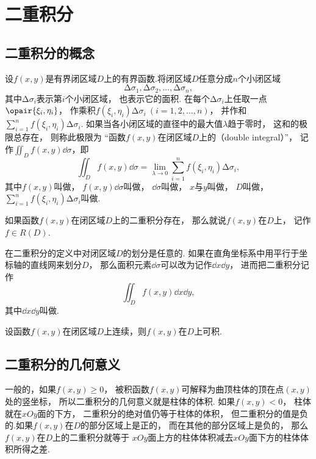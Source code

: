 \section{二重积分}
\subsection{二重积分的概念}
设\(f(x,y)\)是有界闭区域\(D\)上的有界函数.将闭区域\(D\)任意分成\(n\)个小闭区域\begin{equation*}
	\increment\sigma_1,\increment\sigma_2,\dotsc,\increment\sigma_n,
\end{equation*}
其中\(\increment\sigma_i\)表示第\(i\)个小闭区域，
也表示它的面积.
在每个\(\increment\sigma_i\)上任取一点\(\opair{\xi_i,\eta_i}\)，
作乘积\(f(\xi_i,\eta_i) \increment\sigma_i\ (i=1,2,\dotsc,n)\)，
并作和\(\sum_{i=1}^n f(\xi_i,\eta_i) \increment\sigma_i\).
如果当各小闭区域的直径中的最大值\(\lambda\)趋于零时，
这和的极限总存在，
则称此极限为
“函数\(f(x,y)\)在闭区域\(D\)上的（double integral）”，
记作\(\iint_D f(x,y) \dd{\sigma}\)，即
\begin{equation*}
	\iint_D f(x,y) \dd{\sigma}
	= \lim_{\lambda\to0}
	\sum_{i=1}^n f(\xi_i,\eta_i) \increment\sigma_i,
\end{equation*}
其中\(f(x,y)\)叫做，
\(f(x,y) \dd{\sigma}\)叫做，
\(\dd{\sigma}\)叫做，
\(x\)与\(y\)叫做，
\(D\)叫做，
\(\sum_{i=1}^n f(\xi_i,\eta_i) \increment\sigma_i\)叫做.

如果函数\(f(x,y)\)在闭区域\(D\)上的二重积分存在，
那么就说\(f(x,y)\)在\(D\)上，
记作\(f \in R(D)\).

在二重积分的定义中对闭区域\(D\)的划分是任意的.
如果在直角坐标系中用平行于坐标轴的直线网来划分\(D\)，
那么面积元素\(\dd{\sigma}\)可以改为记作\(\dd{x}\dd{y}\)，
进而把二重积分记作\begin{equation*}
	\iint_{D}{f(x,y)\dd{x}\dd{y}},
\end{equation*}
其中\(\dd{x}\dd{y}\)叫做.

\begin{theorem}[充分条件]
设函数\(f(x,y)\)在闭区域\(D\)上连续，则\(f(x,y)\)在\(D\)上可积.
\end{theorem}

\subsection{二重积分的几何意义}
一般的，如果\(f(x,y) \geq 0\)，
被积函数\(f(x,y)\)可解释为曲顶柱体的顶在点\((x,y)\)处的竖坐标，
所以二重积分的几何意义就是柱体的体积.
如果\(f(x,y) < 0\)，
柱体就在\(xOy\)面的下方，
二重积分的绝对值仍等于柱体的体积，
但二重积分的值是负的.如果\(f(x,y)\)在\(D\)的部分区域上是正的，
而在其他的部分区域上是负的，
那么\(f(x,y)\)在\(D\)上的二重积分就等于
\(xOy\)面上方的柱体体积减去\(xOy\)面下方的柱体体积所得之差.

